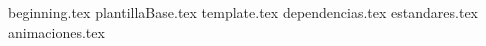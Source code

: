 \documentclass[11pt,oneside]{book}%
\begin{document}
	\frontmatter
		\tableofcontents
		{beginning.tex} 
	\mainmatter
%	
	{plantillaBase.tex}
	{template.tex}
	{dependencias.tex}
	{estandares.tex}
	{animaciones.tex}
	
\end{document}
